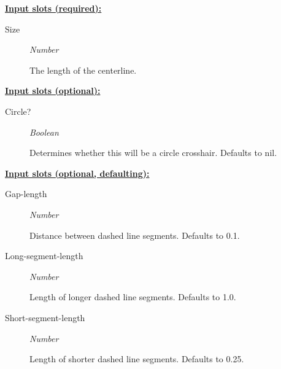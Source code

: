\documentclass [11pt]{book}
\begin{document}
\begin{itemize}
\begin{figure}
\end{figure}





\textbf{
\underline{Input slots (required):}}

\begin{description}

\item [Size]
\emph{Number}

 The length of the centerline.




\end{description}






\textbf{
\underline{Input slots (optional):}}

\begin{description}

\item [Circle?]
\emph{Boolean}

 Determines whether this will be a circle crosshair. Defaults to nil.




\end{description}






\textbf{
\underline{Input slots (optional, defaulting):}}

\begin{description}

\item [Gap-length]
\emph{Number}

 Distance between dashed line segments. Defaults to 0.1.




\item [Long-segment-length]
\emph{Number}

 Length of longer dashed line segments. Defaults to 1.0.




\item [Short-segment-length]
\emph{Number}

 Length of shorter dashed line segments. Defaults to 0.25.




\end{description}







\end{itemize}
\end{document}
